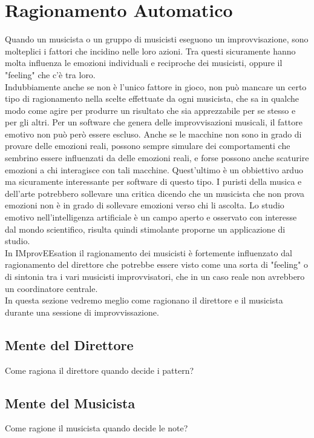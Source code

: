 \section{Ragionamento Automatico}
Quando un musicista o un gruppo di musicisti eseguono un
improvvisazione, sono molteplici i fattori che incidino nelle loro azioni. 
Tra questi sicuramente hanno molta influenza le emozioni
individuali e reciproche dei musicisti, oppure il "feeling" che c'è tra
loro.\\
Indubbiamente anche se non è l'unico fattore in gioco, 
non può mancare un certo tipo di ragionamento
nella scelte effettuate da ogni musicista, che sa in qualche modo come
agire per produrre un risultato che sia apprezzabile per se stesso e per gli
altri. Per un software che genera delle improvvisazioni musicali, il fattore 
emotivo non può però essere escluso. Anche se le macchine non sono in grado
di provare delle emozioni reali, possono sempre simulare dei
comportamenti che sembrino essere influenzati da delle emozioni reali, e
forse possono anche scaturire emozioni a chi interagisce con tali
macchine. Quest'ultimo è un obbiettivo arduo ma sicuramente interessante
per software di questo tipo. I puristi della musica e dell'arte
potrebbero sollevare una critica dicendo che un musicista che non prova
emozioni non è in grado di sollevare emozioni verso chi li ascolta.
Lo studio emotivo nell'intelligenza artificiale è un campo aperto e
osservato con interesse dal mondo scientifico, risulta quindi stimolante
proporne un applicazione di studio.\\
In IMprovEEsation il ragionamento dei musicisti è fortemente influenzato
dal ragionamento del direttore che potrebbe essere visto come una sorta
di "feeling" o di sintonia tra i vari musicisti improvvisatori, che in
un caso reale non avrebbero un coordinatore centrale.\\
In questa sezione vedremo meglio come ragionano il direttore e il
musicista durante una sessione di improvvissazione.
\label{thinking}
\subsection{Mente del Direttore}
Come ragiona il direttore quando decide i pattern?
\subsection{Mente del Musicista}
Come ragione il musicista quando decide le note?
